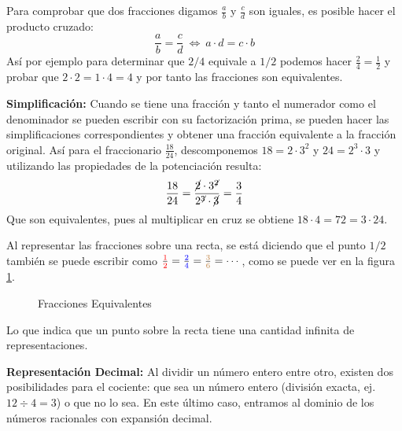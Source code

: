\begin{enumerate}
    Para comprobar que dos fracciones digamos $\frac{a}{b}$ y $\frac{c}{d}$ son iguales, es posible hacer el producto cruzado: 
    \begin{equation}
    \frac{a}{b}=\frac{c}{d}\ \iff\ a\cdot d=c\cdot b 
    \end{equation}
    Así por ejemplo para determinar que $2/4$ equivale a $1/2$ podemos hacer $\frac{2}{4}=\frac{1}{2}$ y probar que $2\cdot 2=1\cdot 4=4$ y por tanto las fracciones son equivalentes.

    \textbf{Simplificación:} Cuando se tiene una fracción y tanto el numerador como el denominador se pueden escribir con su factorización prima, se pueden hacer las simplificaciones correspondientes y obtener una fracción equivalente a la fracción original. Así para el fraccionario $\frac{18}{24}$, descomponemos $18=2\cdot 3^2$ y $24=2^3\cdot 3$ y utilizando las propiedades de la potenciación resulta:
    \[ \frac{18}{24}=\frac{\cancel{2}\cdot 3^{\not2}}{2^{\not3}\cdot \cancel{3}}=\frac{3}{4} \]
    Que son equivalentes, pues al multiplicar en cruz se obtiene $18\cdot 4=72=3\cdot 24$.

    Al representar las fracciones sobre una recta, se está diciendo que el punto $1/2$ también se puede escribir como $\frac{\textcolor{red}{1}}{\textcolor{red}{2}}=\frac{\textcolor{blue}{2}}{\textcolor{blue}{4}}=\frac{\textcolor{brown}{3}}{\textcolor{brown}{6}}=\cdots$, como se puede ver en la figura \ref{fig:fraccion05}.

    \begin{figure}[ht]
    \caption{Fracciones Equivalentes}\label{fig:fraccion05}
    \centering
    \end{figure}

    Lo que indica que un punto sobre la recta tiene una cantidad infinita de representaciones.

\textbf{Representación Decimal:} Al dividir un número entero entre otro, existen dos posibilidades para el cociente: que sea un número entero (división exacta, ej. $12 \div 4 = 3$) o que no lo sea. En este último caso, entramos al dominio de los números racionales con expansión decimal.


\end{enumerate}
